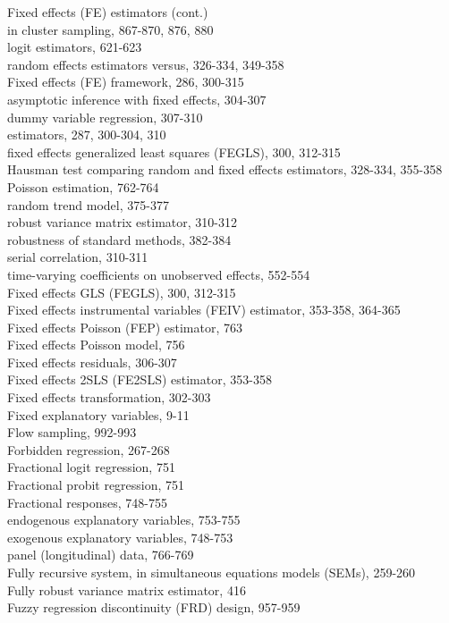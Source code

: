 \documentclass[10pt]{article}
\begin{document}
Fixed effects (FE) estimators (cont.)\\
in cluster sampling, 867-870, 876, 880\\
logit estimators, 621-623\\
random effects estimators versus, 326-334, 349-358\\
Fixed effects (FE) framework, 286, 300-315\\
asymptotic inference with fixed effects, 304-307\\
dummy variable regression, 307-310\\
estimators, 287, 300-304, 310\\
fixed effects generalized least squares (FEGLS), 300, 312-315\\
Hausman test comparing random and fixed effects estimators, 328-334, 355-358\\
Poisson estimation, 762-764\\
random trend model, 375-377\\
robust variance matrix estimator, 310-312\\
robustness of standard methods, 382-384\\
serial correlation, 310-311\\
time-varying coefficients on unobserved effects, 552-554\\
Fixed effects GLS (FEGLS), 300, 312-315\\
Fixed effects instrumental variables (FEIV) estimator, 353-358, 364-365\\
Fixed effects Poisson (FEP) estimator, 763\\
Fixed effects Poisson model, 756\\
Fixed effects residuals, 306-307\\
Fixed effects 2SLS (FE2SLS) estimator, 353-358\\
Fixed effects transformation, 302-303\\
Fixed explanatory variables, 9-11\\
Flow sampling, 992-993\\
Forbidden regression, 267-268\\
Fractional logit regression, 751\\
Fractional probit regression, 751\\
Fractional responses, 748-755\\
endogenous explanatory variables, 753-755\\
exogenous explanatory variables, 748-753\\
panel (longitudinal) data, 766-769\\
Fully recursive system, in simultaneous equations models (SEMs), 259-260\\
Fully robust variance matrix estimator, 416\\
Fuzzy regression discontinuity (FRD) design, 957-959
\end{document}
